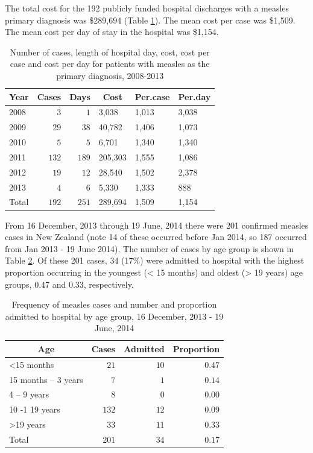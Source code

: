 \documentclass{article}
\begin{document}
The total cost for the 192 publicly funded hospital discharges with a measles primary diagnosis was \$289,694 (Table \ref{table:hosp}). The mean cost per case was \$1,509. The mean cost per day of stay in the hospital was \$1,154.


\begin{table}
\caption{Number of cases, length of hospital day, cost, cost per case and cost per day for patients with measles as the primary diagnosis, 2008-2013}
\begin{center}
\begin{tabular}{lrrlll}
\hline\hline
\multicolumn{1}{c}{Year}&\multicolumn{1}{c}{Cases}&\multicolumn{1}{c}{Days}&\multicolumn{1}{c}{Cost}&\multicolumn{1}{c}{Per.case}&\multicolumn{1}{c}{Per.day}\tabularnewline
\hline
2008&$  3$&$  1$&3,038&1,013&3,038\tabularnewline
2009&$ 29$&$ 38$&40,782&1,406&1,073\tabularnewline
2010&$  5$&$  5$&6,701&1,340&1,340\tabularnewline
2011&$132$&$189$&205,303&1,555&1,086\tabularnewline
2012&$ 19$&$ 12$&28,540&1,502&2,378\tabularnewline
2013&$  4$&$  6$&5,330&1,333&888\tabularnewline
Total&$192$&$251$&289,694&1,509&1,154\tabularnewline
\hline
\end{tabular}\end{center}\label{table:hosp}
\end{table}

From 16 December, 2013 through 19 June, 2014 there were 201 confirmed measles cases in New Zealand (note 14 of these occurred before Jan 2014, so 187 occurred from Jan 2013 - 19 June 2014). The number of cases by age group is shown in Table \ref{table:freq}. Of these 201 cases, 34 (17\%) were admitted to hospital with the highest proportion occurring in the youngest (< 15 months) and oldest (> 19 years) age groups, 0.47 and 0.33, respectively.


\begin{table}
\caption{Frequency of measles cases and number and proportion admitted to hospital by age group, 16 December, 2013 - 19 June, 2014}
\begin{center}
\begin{tabular}{lrrr}
\hline\hline
\multicolumn{1}{c}{Age}&\multicolumn{1}{c}{Cases}&\multicolumn{1}{c}{Admitted}&\multicolumn{1}{c}{Proportion}\tabularnewline
\hline
\textless  15 months&$ 21$&$10$&$0.47$\tabularnewline
15 months – 3 years&$  7$&$ 1$&$0.14$\tabularnewline
4 – 9 years&$  8$&$ 0$&$0.00$\tabularnewline
10 -1 19 years&$132$&$12$&$0.09$\tabularnewline
\textgreater  19 years&$ 33$&$11$&$0.33$\tabularnewline
Total&$201$&$34$&$0.17$\tabularnewline
\hline
\end{tabular}\end{center}\label{table:freq}
\end{table}
\end{document}
